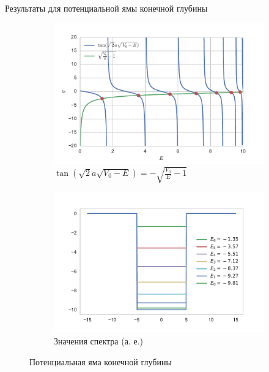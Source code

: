 \documentclass{beamer}
\begin{document}
\begin{frame}{Результаты для потенциальной ямы конечной глубины}

\begin{figure}[h!]
\centering
\begin{subfigure}{.5\textwidth}
  \centering
  \includegraphics[width=1.0\linewidth]{tan-sqrt.pdf}
  \caption{$\tan(\sqrt{2} a \sqrt{V_0-E})=-\sqrt{\frac{V_0}{E}-1}$}
  \label{fig1:tan-sqrt}
\end{subfigure}%
\begin{subfigure}{.5\textwidth}
  \centering
  \includegraphics[width=1.0\linewidth]{ens_finite.pdf}
  \caption{Значения спектра (а. е.)}
  \label{fig:finite_well_sol}
\end{subfigure}
\caption{Потенциальная яма конечной глубины}
\label{fig:fin_well}
\end{figure}
  
\end{frame}
\end{document}
